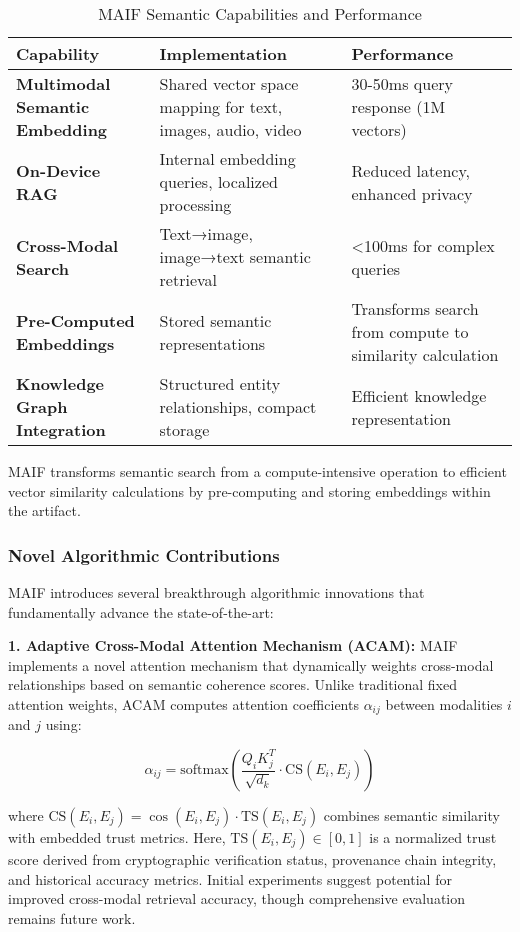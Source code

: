 \documentclass[conference]{IEEEtran}
\begin{document}
\begin{table*}[!t]
\renewcommand{\arraystretch}{1.3}
\caption{MAIF Semantic Capabilities and Performance}
\label{tab:semantic-capabilities}
\centering
\footnotesize
\begin{tabular}{p{3.5cm}p{5cm}p{4.5cm}}
\toprule
\textbf{Capability} & \textbf{Implementation} & \textbf{Performance} \\
\midrule
\textbf{Multimodal Semantic Embedding} & Shared vector space mapping for text, images, audio, video & 30-50ms query response (1M vectors) \\
\textbf{On-Device RAG} & Internal embedding queries, localized processing & Reduced latency, enhanced privacy \\
\textbf{Cross-Modal Search} & Text→image, image→text semantic retrieval & <100ms for complex queries \\
\textbf{Pre-Computed Embeddings} & Stored semantic representations & Transforms search from compute to similarity calculation \\
\textbf{Knowledge Graph Integration} & Structured entity relationships, compact storage & Efficient knowledge representation \\
\bottomrule
\end{tabular}
\end{table*}

MAIF transforms semantic search from a compute-intensive operation to efficient vector similarity calculations by pre-computing and storing embeddings within the artifact.


\subsubsection{Novel Algorithmic Contributions}

MAIF introduces several breakthrough algorithmic innovations that fundamentally advance the state-of-the-art:

\textbf{1. Adaptive Cross-Modal Attention Mechanism (ACAM):}
MAIF implements a novel attention mechanism that dynamically weights cross-modal relationships based on semantic coherence scores. Unlike traditional fixed attention weights, ACAM computes attention coefficients $\alpha_{ij}$ between modalities $i$ and $j$ using:

$$\alpha_{ij} = \text{softmax}\left(\frac{Q_i K_j^T}{\sqrt{d_k}} \cdot \text{CS}(E_i, E_j)\right)$$

where $\text{CS}(E_i, E_j) = \cos(E_i, E_j) \cdot \text{TS}(E_i, E_j)$ combines semantic similarity with embedded trust metrics. Here, $\text{TS}(E_i, E_j) \in [0,1]$ is a normalized trust score derived from cryptographic verification status, provenance chain integrity, and historical accuracy metrics. Initial experiments suggest potential for improved cross-modal retrieval accuracy, though comprehensive evaluation remains future work.
\end{document}
